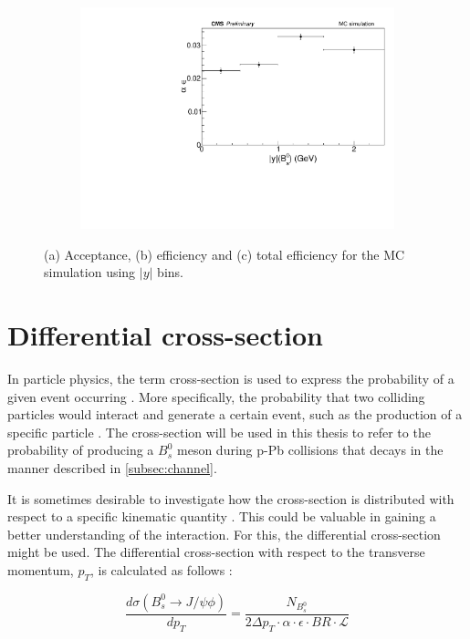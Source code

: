 \begin{figure}[htp!]
\begin{subfigure}[b]{0.8\textwidth}
		\includegraphics[width=\textwidth]{MainContent/Figs/effy/totaleffy_ybins.PDF}
		\caption{}%
	\end{subfigure}
	\caption{(a) Acceptance, (b) efficiency and (c) total efficiency for the MC simulation using $|y|$ bins.}
	\label{fig:effy_ybins}
\end{figure}

\section{Differential cross-section}

In particle physics, the term cross-section is used to express the probability of a given event occurring \cite{thomson2013modern}. More specifically, the probability that two colliding particles would interact and generate a certain event, such as the production of a specific particle \cite{pivarski2013}. The cross-section will be used in this thesis to refer to the probability of producing a $B^0_s$ meson during p-Pb collisions that decays in the manner described in \ref{subsec:channel}.

It is sometimes desirable to investigate how the cross-section is distributed with respect to a specific kinematic quantity  \cite{thomson2013modern}. This could be valuable in gaining a better understanding of the interaction. For this, the differential cross-section might be used. The differential cross-section with respect to the transverse momentum, $p_T$, is calculated as follows \cite{abe1995measurement}: 

\begin{equation}
	\label{eq:cs}
\frac{d \sigma(B_s^0 \to J/\psi\phi)}{dp_T} = \frac{N_{B^0_s}}{2 \Delta p_T \cdot \alpha \cdot \epsilon \cdot BR \cdot \mathcal{L}}
\end{equation}

